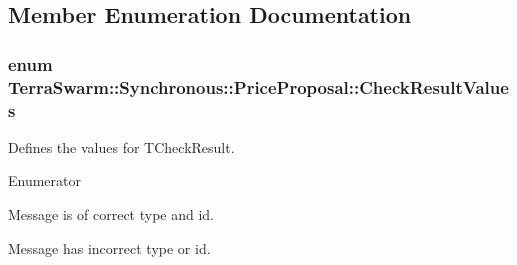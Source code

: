 \subsection{Member Enumeration Documentation}
\hypertarget{class_terra_swarm_1_1_synchronous_1_1_price_proposal_afd8478709e56657c81455a26ce72ccf5}{
\subsubsection[{Check\-Result\-Values}]{\setlength{\rightskip}{0pt plus 5cm}enum {\bf Terra\-Swarm\-::\-Synchronous\-::\-Price\-Proposal\-::\-Check\-Result\-Values}}}\label{class_terra_swarm_1_1_synchronous_1_1_price_proposal_afd8478709e56657c81455a26ce72ccf5}


Defines the values for T\-Check\-Result. 

\begin{Desc}
\item[Enumerator]\par
\begin{description}
\item[{\em 
\hypertarget{class_terra_swarm_1_1_synchronous_1_1_price_proposal_afd8478709e56657c81455a26ce72ccf5ac810ff36c431d78082d6734fe1f78025}{Success}\label{class_terra_swarm_1_1_synchronous_1_1_price_proposal_afd8478709e56657c81455a26ce72ccf5ac810ff36c431d78082d6734fe1f78025}
}]Message is of correct type and id. \item[{\em 
\hypertarget{class_terra_swarm_1_1_synchronous_1_1_price_proposal_afd8478709e56657c81455a26ce72ccf5a3ab8a257a8c21581a5377bf17c20e1cd}{Fail}\label{class_terra_swarm_1_1_synchronous_1_1_price_proposal_afd8478709e56657c81455a26ce72ccf5a3ab8a257a8c21581a5377bf17c20e1cd}
}]Message has incorrect type or id. \end{description}
\end{Desc}


